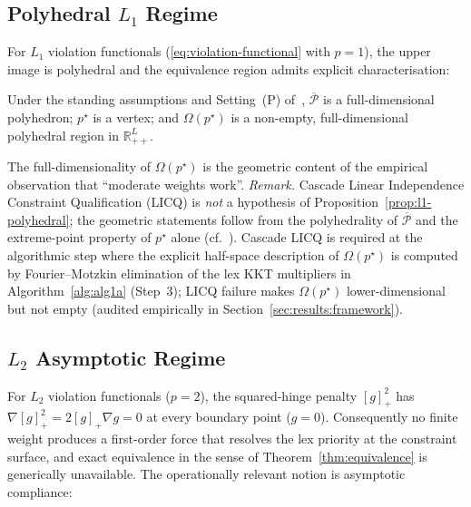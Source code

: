 \subsection{Polyhedral $L_1$ Regime}
\label{sec:foundations:l1}

For $L_1$ violation functionals (\eqref{eq:violation-functional} with $p = 1$), the upper image is polyhedral and the equivalence region admits explicit characterisation:

\begin{proposition}
\label{prop:l1-polyhedral}
Under the standing assumptions and Setting~(P) of~\cite{lcp2025}, $\overline{\mathcal{P}}$ is a full-dimensional polyhedron; $p^{\star}$ is a vertex; and $\Omega(p^{\star})$ is a non-empty, full-dimensional polyhedral region in $\mathbb{R}_{++}^{L}$.
\end{proposition}

The full-dimensionality of $\Omega(p^{\star})$ is the geometric content of the empirical observation that ``moderate weights work''. \emph{Remark.} Cascade Linear Independence Constraint Qualification (LICQ) is \emph{not} a hypothesis of Proposition~\ref{prop:l1-polyhedral}; the geometric statements follow from the polyhedrality of $\overline{\mathcal{P}}$ and the extreme-point property of $p^{\star}$ alone (cf.~\cite[Remark~5.1]{lcp2025}). Cascade LICQ is required at the algorithmic step where the explicit half-space description of $\Omega(p^{\star})$ is computed by Fourier--Motzkin elimination of the lex KKT multipliers in Algorithm~\ref{alg:alg1a} (Step~3); LICQ failure makes $\Omega(p^{\star})$ lower-dimensional but not empty (audited empirically in Section~\ref{sec:results:framework}).

\subsection{$L_2$ Asymptotic Regime}
\label{sec:foundations:l2}

For $L_2$ violation functionals ($p = 2$), the squared-hinge penalty $[g]_+^2$ has $\nabla [g]_+^2 = 2[g]_+ \nabla g = 0$ at every boundary point ($g = 0$). Consequently no finite weight produces a first-order force that resolves the lex priority at the constraint surface, and exact equivalence in the sense of Theorem~\ref{thm:equivalence} is generically unavailable. The operationally relevant notion is asymptotic compliance:


